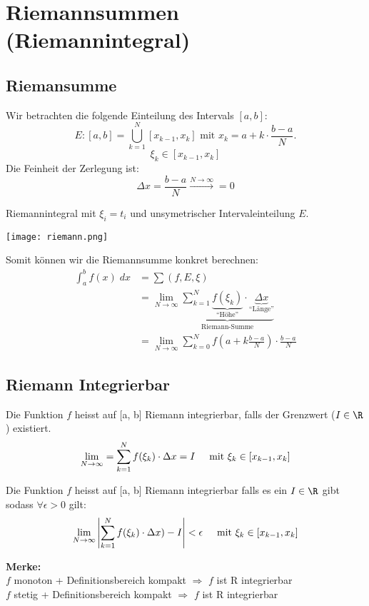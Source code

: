 \section{Riemannsummen (Riemannintegral)}
\subsection{Riemansumme}
Wir betrachten die folgende Einteilung des Intervals $[a,b]$:\[
E: [a,b] = \bigcup_{k=1}^{N}[x_{k-1}, x_k] \text{ mit } x_k = a + k \cdot \frac{b-a}{N}.
\]
\[
	\xi_k \in [x_{k-1}, x_k]
\]
Die Feinheit der Zerlegung ist:
\[
\Delta x = \frac{b-a}{N} \xrightarrow{N \to \infty} = 0
\]


\begin{minipage}{0.4\columnwidth}
	Riemannintegral mit $\xi_i = t_i$ und unsymetrischer Intervaleinteilung $E$.
\end{minipage}
\begin{minipage}{0.60\columnwidth}
	\texttt{[image: riemann.png]}
\end{minipage}

Somit können wir die Riemannsumme konkret berechnen:
\begin{align*}
\int_a^b f(x)\;dx &=\sum (f,E,\xi)\\
&= \lim_{N \to \infty} \underbrace{\sum_{k=1}^{N}
	\underbrace{f(\xi_k)}_{\text{``Höhe''}} \cdot \underbrace{\Delta x}_{\text{``Länge''}}}_{\text{Riemann-Summe}}\\
&= \lim_{N \to \infty} \sum_{k=0}^{N} {f(a + k\frac{b-a}{N})} \cdot \frac{b-a}{N}
\end{align*}


\subsection{Riemann Integrierbar}
\begin{definition}  Die Funktion $f$ heisst auf [a, b] Riemann integrierbar, falls der Grenzwert ($I \in \R$) existiert.
\[
	\lim_{N \to \infty} = \sum_{k = 1}^N f(\xi_k) \cdot \Delta x = I \hspace{0.5cm} \text{mit } \xi_k \in [x_{k-1}, x_k]
\]
\end{definition}

\begin{definition} 
Die Funktion $f$ heisst auf [a, b] Riemann integrierbar falls es ein $I \in \R$ gibt sodass $\forall \epsilon > 0$ gilt:
\[
	\lim_{N \to \infty} \left| \sum_{k = 1}^N f(\xi_k) \cdot \Delta x) - I \right| < \epsilon \hspace{0.5cm} \text{mit } \xi_k \in [x_{k-1}, x_k]
\]
\end{definition}
\textbf{Merke:}\\
$f$ monoton + Definitionsbereich kompakt $\Rightarrow$ $f$ ist R integrierbar\\
$f$ stetig + Definitionsbereich kompakt $\Rightarrow$ $f$ ist R integrierbar

